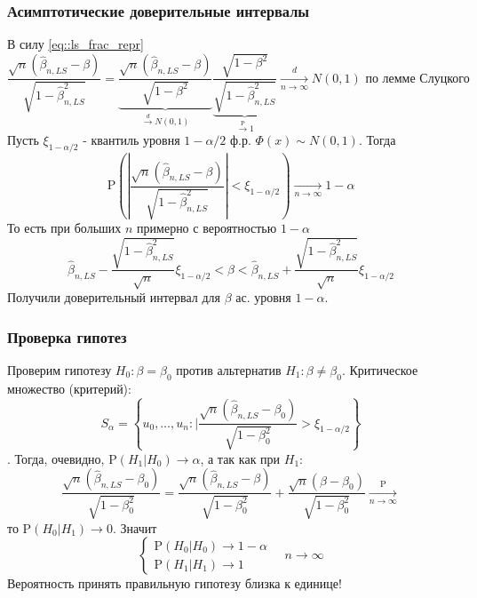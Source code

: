 \documentclass[12pt]{article}
\def\P{ \mathrm{P} }
\begin{document}
\subsubsection*{Асимптотические доверительные интервалы}
В силу \eqref{eq::ls_frac_repr} 
\[\frac{\sqrt{n}(\widehat{\beta}_{n,LS}-\beta)}{\sqrt{1-\widehat{\beta}_{n,LS}^2}}=\underbrace{\frac{\sqrt{n}(\widehat{\beta}_{n,LS}-\beta)}{\sqrt{1-\beta^2}}}_{\xrightarrow{d}N(0,1)}\underbrace{\frac{\sqrt{1-\beta^2}}{\sqrt{1-\widehat{\beta}_{n,LS}^2}}}_{\xrightarrow{\P}1}\xrightarrow[n\rightarrow\infty]{d}N(0,1)\text{ по лемме Слуцкого}\]
Пусть $\xi_{1-\alpha/2}$ - квантиль уровня $1-\alpha/2$ ф.р. $\Phi(x)\sim N(0,1)$. Тогда
\[\P(\left\lvert \frac{\sqrt{n}(\widehat{\beta}_{n,LS}-\beta)}{\sqrt{1-\widehat{\beta}_{n,LS}^2}}\right\rvert <\xi_{1-\alpha/2})\xrightarrow[n\rightarrow\infty]{} 1-\alpha\]
То есть при больших $n$ примерно с вероятностью $1-\alpha$
\[\widehat{\beta}_{n,LS}-\frac{\sqrt{1-\widehat{\beta}_{n,LS}^2}}{\sqrt{n}}\xi_{1-\alpha/2}<\beta<\widehat{\beta}_{n,LS}+\frac{\sqrt{1-\widehat{\beta}_{n,LS}^2}}{\sqrt{n}}\xi_{1-\alpha/2}\]
Получили доверительный интервал для $\beta$ ас. уровня $1-\alpha$.

\subsubsection*{Проверка гипотез}
Проверим гипотезу $H_0:\beta=\beta_0$ против альтернатив $H_1:\beta\neq\beta_0$.
Критическое множество (критерий):
\[S_\alpha=\left\{u_0,\ldots,u_n: |\frac{\sqrt{n}(\widehat{\beta}_{n,LS}-\beta_0)}{\sqrt{1-\beta_0^2}}>\xi_{1-\alpha/2}\right\}\].
Тогда, очевидно, $\P(H_1|H_0)\rightarrow\alpha$, а так как при $H_1$:
\[\frac{\sqrt{n}(\widehat{\beta}_{n,LS}-\beta_0)}{\sqrt{1-\beta_0^2}}=\frac{\sqrt{n}(\widehat{\beta}_{n,LS}-\beta)}{\sqrt{1-\beta_0^2}}+\frac{\sqrt{n}(\beta-\beta_0)}{\sqrt{1-\beta_0^2}}\xrightarrow[n\rightarrow\infty]{\P}\]
то $\P(H_0|H_1)\rightarrow0$. Значит
\[\begin{cases}
    \P(H_0|H_0)\rightarrow1-\alpha \\
    \P(H_1|H_1)\rightarrow1
\end{cases}\quad n\rightarrow\infty\]
Вероятность принять правильную гипотезу близка к единице!
\end{document}
